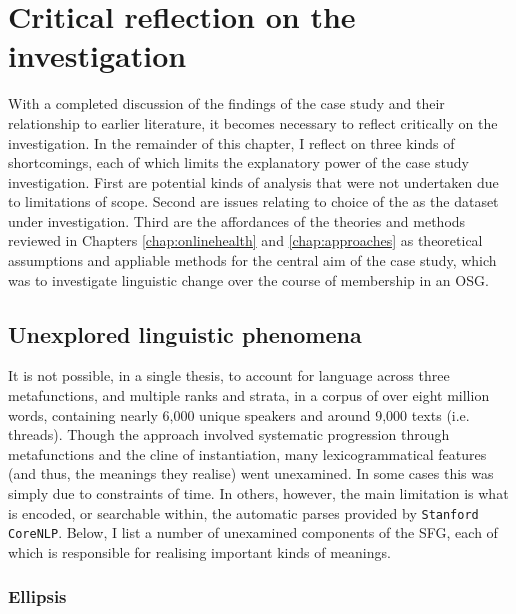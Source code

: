 \section{Critical reflection on the investigation}

With a completed discussion of the findings of the case study and their relationship to earlier literature, it becomes necessary to reflect critically on the investigation. In the remainder of this chapter, I reflect on three kinds of shortcomings, each of which limits the explanatory power of the case study investigation. First are potential kinds of analysis that were not undertaken due to limitations of scope. Second are issues relating to choice of the  as the dataset under investigation. Third are the affordances of the theories and methods reviewed in Chapters \ref{chap:onlinehealth} and \ref{chap:approaches} as theoretical assumptions and appliable methods for the central aim of the case study, which was to investigate linguistic change over the course of membership in an \gls{OSG}.

\subsection{Unexplored linguistic phenomena}

It is not possible, in a single thesis, to account for language across three metafunctions, and multiple ranks and strata, in a \gls{corpus} of over eight million words, containing nearly 6,000 unique speakers and around 9,000 texts (i.e. \glspl{thread}). Though the approach involved systematic progression through metafunctions and the cline of instantiation, many lexicogrammatical features (and thus, the meanings they realise) went unexamined. In some cases this was simply due to constraints of time. In others, however, the main limitation is what is encoded, or searchable within, the automatic parses provided by \texttt{Stanford CoreNLP}. Below, I list a number of unexamined components of the \gls{SFG}, each of which is responsible for realising important kinds of meanings.

\subsubsection*{Ellipsis}

